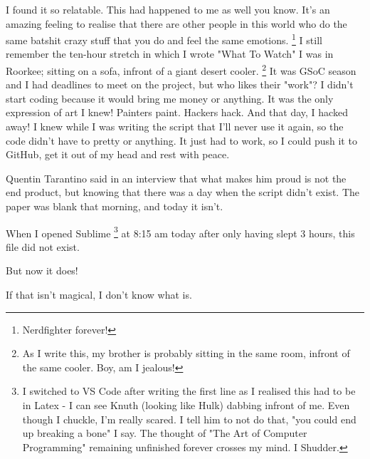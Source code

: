 \documentclass[]{report}
\begin{document}
I found it so relatable. This had happened to me as well you know. It's an amazing feeling to realise that there are other people in this world who do the same batshit crazy stuff that you do and feel the same emotions.
\footnote{Nerdfighter forever!}
I still remember the ten-hour stretch in which I wrote "What To Watch"
I was in Roorkee; sitting on a sofa, infront of a giant  desert cooler.
\footnote{As I write this, my brother is probably sitting in the same room, infront of the same cooler. Boy, am I jealous!}
It was GSoC season and I had deadlines to meet on the project, but who likes their "work"?
I didn't start coding because it would bring me money or anything. It was the only expression of art I knew! 
Painters paint. Hackers hack.
And that day, I hacked away! I knew while I was writing the script that I'll never use it again, so the code didn't have to pretty or anything. It just had to work, so I could push it to GitHub, get it out of my head and rest with peace.

Quentin Tarantino said in an interview that what makes him proud is not the end product, but knowing that there was a day when the script didn't exist. The paper was blank that morning, and today it isn't. 

When I opened Sublime 
\footnote{I switched to VS Code after writing the first line as I realised this had to be in Latex - I can see Knuth (looking like Hulk) dabbing infront of me. Even though I chuckle, I'm really scared. I tell him to not do that, "you could end up breaking a bone" I say. The thought of "The Art of Computer Programming" remaining unfinished forever crosses my mind. I Shudder.}
at 8:15 am today after only having slept 3 hours, this file did not exist. 

But now it does! 

If that isn't magical, I don't know what is.
\end{document}
